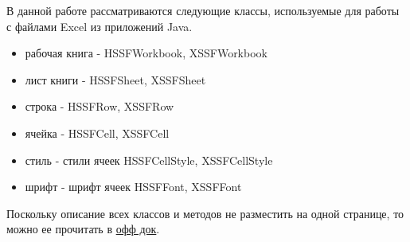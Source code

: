 В данной работе рассматриваются следующие классы, используемые для работы с файлами Excel из приложений Java.
\begin{itemize}
	\item рабочая книга - HSSFWorkbook, XSSFWorkbook
	\item лист книги - HSSFSheet, XSSFSheet
	\item строка - HSSFRow, XSSFRow
	\item ячейка - HSSFCell, XSSFCell
	\item стиль - стили ячеек HSSFCellStyle, XSSFCellStyle
	\item шрифт - шрифт ячеек HSSFFont, XSSFFont
\end{itemize}

Поскольку описание всех классов и методов не разместить на одной странице, то можно ее прочитать в \href{https://poi.apache.org/apidocs/index.html}{офф док}.



